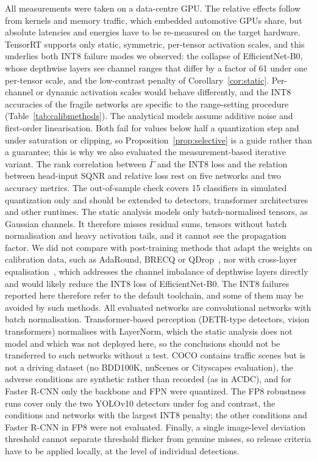 \documentclass[pdflatex,sn-mathphys-num]{sn-jnl}%
\theoremstyle{thmstyleone}%
\theoremstyle{thmstyletwo}%
\theoremstyle{thmstylethree}%
\begin{document}
All measurements were taken on a data-centre GPU. The relative effects follow from kernels and memory traffic, which embedded automotive GPUs share, but absolute latencies and energies have to be re-measured on the target hardware. TensorRT supports only static, symmetric, per-tensor activation scales, and this underlies both INT8 failure modes we observed: the collapse of EfficientNet-B0, whose depthwise layers see channel ranges that differ by a factor of 61 under one per-tensor scale, and the low-contrast penalty of Corollary~\ref{cor:static}. Per-channel or dynamic activation scales would behave differently, and the INT8 accuracies of the fragile networks are specific to the range-setting procedure (Table~\ref{tab:calibmethods}). The analytical models assume additive noise and first-order linearisation. Both fail for values below half a quantization step and under saturation or clipping, so Proposition~\ref{prop:selective} is a guide rather than a guarantee; this is why we also evaluated the measurement-based iterative variant. The rank correlation between $\bar\Gamma$ and the INT8 loss and the relation between head-input SQNR and relative loss rest on five networks and two accuracy metrics. The out-of-sample check covers 15 classifiers in simulated quantization only and should be extended to detectors, transformer architectures and other runtimes. The static analysis models only batch-normalised tensors, as Gaussian channels. It therefore misses residual sums, tensors without batch normalisation and heavy activation tails, and it cannot see the propagation factor. We did not compare with post-training methods that adapt the weights on calibration data, such as AdaRound, BRECQ or QDrop~\cite{nagel2020adaround,li2021brecq,wei2022qdrop}, nor with cross-layer equalisation~\cite{nagel2019datafree}, which addresses the channel imbalance of depthwise layers directly and would likely reduce the INT8 loss of EfficientNet-B0. The INT8 failures reported here therefore refer to the default toolchain, and some of them may be avoided by such methods. All evaluated networks are convolutional networks with batch normalisation. Transformer-based perception (DETR-type detectors, vision transformers) normalises with LayerNorm, which the static analysis does not model and which was not deployed here, so the conclusions should not be transferred to such networks without a test. COCO contains traffic scenes but is not a driving dataset (no BDD100K, nuScenes or Cityscapes evaluation), the adverse conditions are synthetic rather than recorded (as in ACDC), and for Faster R-CNN only the backbone and FPN were quantized. The FP8 robustness runs cover only the two YOLOv10 detectors under fog and contrast, the conditions and networks with the largest INT8 penalty; the other conditions and Faster R-CNN in FP8 were not evaluated. Finally, a single image-level deviation threshold cannot separate threshold flicker from genuine misses, so release criteria have to be applied locally, at the level of individual detections.
\end{document}
